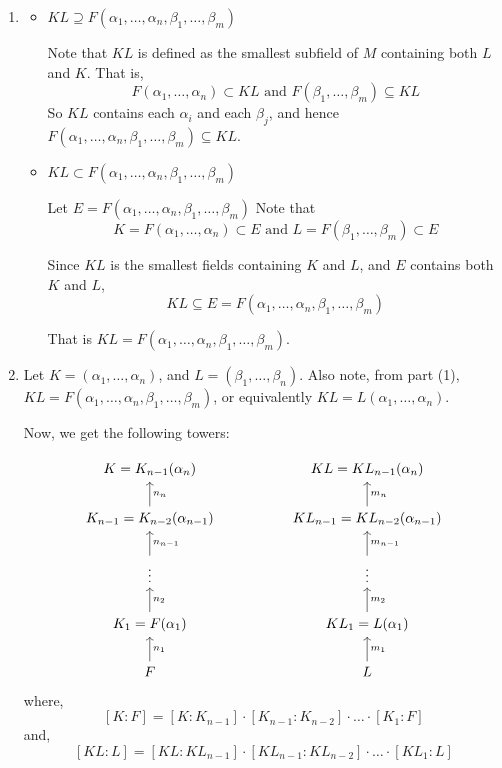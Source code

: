 \documentclass[12pt]{article}
\begin{document}
\begin{solution}
    \bbni

    \begin{enumerate}
        \item [(a)]
        \begin{itemize}
            \item[($\Leftarrow$)] $KL \supseteq F(\alpha_1, \dots, \alpha_n, \beta_1, \dots, \beta_m)$
        
            Note that $KL$ is defined as the smallest subfield of $M$ containing both $L$ and $K$. That is, 
            \[F(\alpha_1, \dots, \alpha_n) \subset KL \text{ and } F(\beta_1, \dots, \beta_m) \subseteq KL\]
            So $KL$ contains each $\alpha_i$ and each $\beta_j$, and hence $F(\alpha_1, \dots, \alpha_n, \beta_1, \dots, \beta_m) \subseteq KL$. 
            \bbni 
            
            \item [($\Rightarrow$)] $KL \subset F(\alpha_1, \dots, \alpha_n, \beta_1, \dots, \beta_m)$
            
            Let $E = F(\alpha_1, \dots, \alpha_n, \beta_1, \dots, \beta_m)$
            Note that \[K = F(\alpha_1, \dots, \alpha_n) \subset E \text{ and } L = F(\beta_1, \dots, \beta_m) \subset E\]
            
            Since $KL$ is the smallest fields containing $K$ and $L$, and $E$ contains both $K$ and $L$, 
            \[KL \subseteq E = F(\alpha_1, \dots, \alpha_n, \beta_1, \dots, \beta_m)\] 

            That is $KL = F(\alpha_1, \ldots, \alpha_n, \beta_1, \ldots, \beta_m)$. 
        \end{itemize}


        \item [(b)]  Let $K = (\alpha_1, \ldots, \alpha_n)$, and $L =(\beta_1, \ldots, \beta_n)$. Also note, from part (1), $KL = F(\alpha_1, \ldots, \alpha_n, \beta_1, \ldots, \beta_m)$, or equivalently $KL = L(\alpha_1, \ldots, \alpha_n)$. 
        
        Now, we get the following towers: 

        \[
        \begin{tikzcd}
        K = K_{n-1}(\alpha_n) & & KL = KL_{n-1}(\alpha_n) \\
        K_{n-1} = K_{n-2}(\alpha_{n-1}) \arrow[u, "n_n"'] & & KL_{n-1} = KL_{n-2}(\alpha_{n-1}) \arrow[u, "m_n"'] \\
        \vdots \arrow[u, "n_{n-1}"'] & & \vdots \arrow[u, "m_{n-1}"'] \\
        K_1 = F(\alpha_1) \arrow[u, "n_2"'] & & KL_1 = L(\alpha_1) \arrow[u, "m_2"'] \\
        F \arrow[u, "n_1"'] & & L \arrow[u, "m_1"']
        \end{tikzcd}
        \]
        where, 
        \[[K:F] = [K: K_{n-1}]\cdot [K_{n-1}: K_{n-2}] \cdot \ldots \cdot [K_1:F]\]
        and, 
        \[[KL:L] = [KL: KL_{n-1}]\cdot [KL_{n-1}: KL_{n-2}] \cdot \ldots \cdot [KL_1:L]\]


\end{enumerate}
\end{solution}
\end{document}
